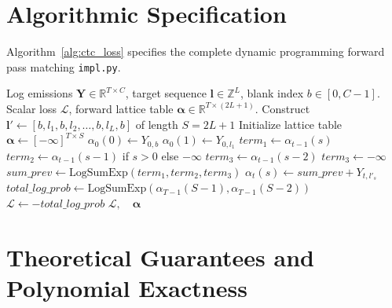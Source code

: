 \documentclass[11pt]{article}
\begin{document}
\section{Algorithmic Specification}
\label{sec:algorithm}

Algorithm~\ref{alg:ctc_loss} specifies the complete dynamic programming forward pass matching \texttt{impl.py}.

\begin{algorithm}[H]
\caption{Connectionist Temporal Classification (CTC) Forward Lattice Loss}
\label{alg:ctc_loss}
\begin{algorithmic}[1]
\Require Log emissions $\mathbf{Y} \in \mathbb{R}^{T \times C}$, target sequence $\mathbf{l} \in \mathbb{Z}^L$, blank index $b \in [0, C-1]$.
\Ensure Scalar loss $\mathcal{L}$, forward lattice table $\boldsymbol{\alpha} \in \mathbb{R}^{T \times (2L+1)}$.
\State Construct $\mathbf{l}' \gets [b, l_1, b, l_2, \dots, b, l_L, b]$ of length $S = 2L + 1$
\State Initialize lattice table $\boldsymbol{\alpha} \gets [-\infty]^{T \times S}$
\State $\alpha_0(0) \gets Y_{0, b}$
    \State $\alpha_0(1) \gets Y_{0, l_1}$
\EndIf
{}
        \State $term_1 \gets \alpha_{t-1}(s)$
        \State $term_2 \gets \alpha_{t-1}(s-1)$ if $s > 0$ else $-\infty$
            \State $term_3 \gets \alpha_{t-1}(s-2)$
        \Else
            \State $term_3 \gets -\infty$
        \EndIf
        \State $sum\_prev \gets \mathrm{LogSumExp}(term_1, term_2, term_3)$
        \State $\alpha_t(s) \gets sum\_prev + Y_{t, l'_s}$
    \EndFor
\EndFor
\State $total\_log\_prob \gets \mathrm{LogSumExp}(\alpha_{T-1}(S-1), \alpha_{T-1}(S-2))$
\State $\mathcal{L} \gets -total\_log\_prob$
\State \Return $\mathcal{L}, \quad \boldsymbol{\alpha}$
\end{algorithmic}
\end{algorithm}

\section{Theoretical Guarantees and Polynomial Exactness}
\label{sec:guarantees}
\end{document}
